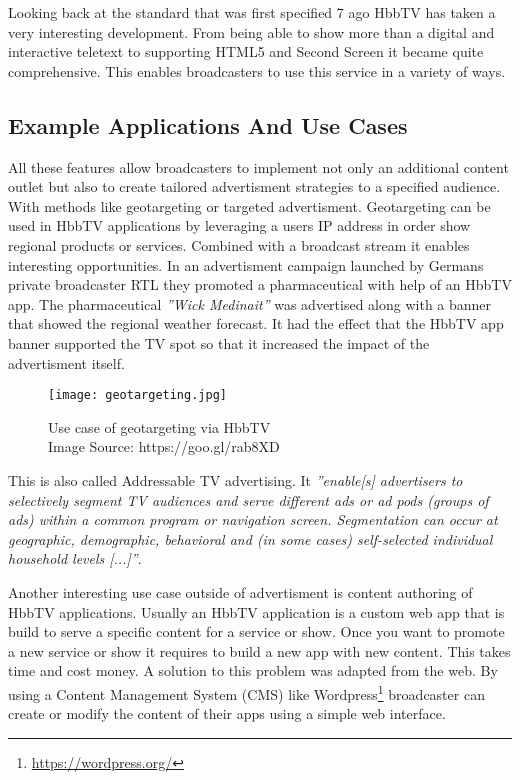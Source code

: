 Looking back at the standard that was first specified 7 ago HbbTV has taken a very interesting
development. From being able to show more than a digital and interactive teletext to supporting
HTML5 and Second Screen it became quite comprehensive. This enables broadcasters to use this
service in a variety of ways.

\subsection{Example Applications And Use Cases}

All these features allow broadcasters to implement not only an additional content outlet but also
to create tailored advertisment strategies to a specified audience. With methods like geotargeting
or targeted advertisment. Geotargeting can be used in HbbTV applications by leveraging a users
IP address in order show regional products or services. Combined with a broadcast stream it
enables interesting opportunities. In an advertisment campaign launched by Germans private
broadcaster RTL they promoted a pharmaceutical with help of an HbbTV app. The pharmaceutical
\textit{''Wick Medinait''} was advertised along with a banner that showed the regional weather
forecast. It had the effect that the HbbTV app banner supported the TV spot so that it increased
the impact of the advertisment itself.

\begin{figure}[htb]
  \centering
  \texttt{[image: geotargeting.jpg]}\\
  \caption{
    Use case of geotargeting via HbbTV\\
    {\tiny Image Source: https://goo.gl/rab8XD}
  }
  \label{fig:geotargeting}
\end{figure}

This is also called Addressable TV advertising. It \textit{''enable[s] advertisers to selectively
segment TV audiences and serve different ads or ad pods (groups of ads) within a common program or
navigation screen. Segmentation can occur at geographic, demographic, behavioral and (in some cases)
self-selected individual household levels [...]''}\cite{adrTV}.

Another interesting use case outside of advertisment is content authoring of HbbTV applications.
Usually an HbbTV application is a custom web app that is build to serve a specific content for
a service or show. Once you want to promote a new service or show it requires to build a new
app with new content. This takes time and cost money. A solution to this problem was adapted from
the web. By using a Content Management System (CMS) like Wordpress\footnote{\url{https://wordpress.org/}}
broadcaster can create or modify the content of their apps using a simple web interface.

